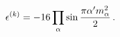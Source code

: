 \begin{equation}
\epsilon^{(k)}=-16 \prod_\alpha\sin {\pi \alpha' m^2_\alpha \over 2}  \, .
\label{eigenM}
\end{equation}

